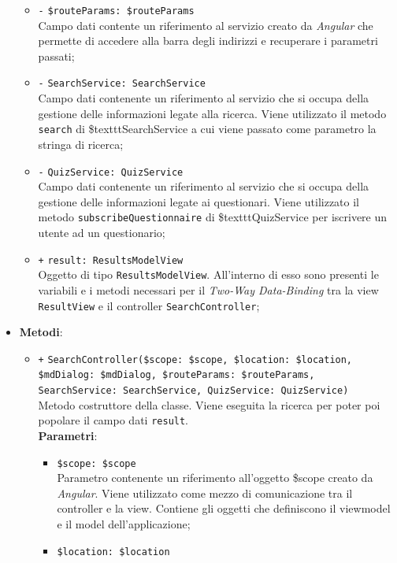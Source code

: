 \begin{itemize}
\begin{itemize}
		\item \texttt{-} \texttt{\$routeParams: \$routeParams} \\
		Campo dati contente un riferimento al servizio creato da \textit{Angular} che permette di accedere alla barra degli indirizzi e recuperare i parametri passati; 
		\item \texttt{-} \texttt{SearchService: SearchService} \\
		Campo dati contenente un riferimento al servizio che si occupa della gestione delle informazioni legate alla ricerca. Viene utilizzato il metodo \texttt{search} di \$texttt{SearchService} a cui viene passato come parametro la stringa di ricerca;
		\item \texttt{-} \texttt{QuizService: QuizService} \\
		Campo dati contenente un riferimento al servizio che si occupa della gestione delle informazioni legate ai questionari. Viene utilizzato il metodo \texttt{subscribeQuestionnaire} di \$texttt{QuizService} per iscrivere un utente ad un questionario;
		\item \texttt{+} \texttt{result: ResultsModelView} \\
		Oggetto di tipo \texttt{ResultsModelView}. All'interno di esso sono presenti le variabili e i metodi necessari per il \textit{Two-Way Data-Binding} tra la view \texttt{ResultView} e il controller \texttt{SearchController};
	\end{itemize}
	\item \textbf{Metodi}:
	\begin{itemize}
		\item \texttt{+} \texttt{SearchController(\$scope: \$scope, \$location: \$location, \$mdDialog: \$mdDialog, \$routeParams: \$routeParams, SearchService: SearchService, QuizService: QuizService)} \\
		Metodo costruttore della classe. Viene eseguita la ricerca per poter poi popolare il campo dati \texttt{result}. \\
		\textbf{Parametri}:
		\begin{itemize}
			\item \texttt{\$scope: \$scope} \\
			Parametro contenente un riferimento all’oggetto \$scope creato da \textit{Angular}. Viene utilizzato come mezzo di comunicazione tra il controller e la view. Contiene gli oggetti che definiscono il viewmodel e il model dell’applicazione;
			\item \texttt{\$location: \$location} \\

\end{itemize}
\end{itemize}
\end{itemize}
